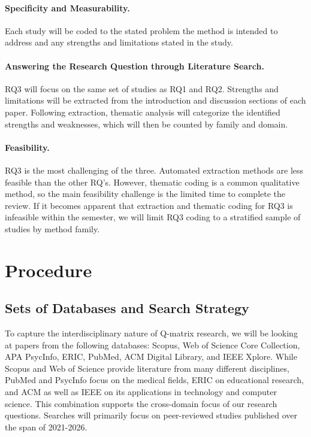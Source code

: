 \documentclass[sigconf,nonacm]{acmart}
\begin{document}
\paragraph{Specificity and Measurability.} Each study will be coded to the stated problem the method is intended to address and any strengths and limitations stated in the study.

\paragraph{Answering the Research Question through Literature Search.} RQ3 will focus on the same set of studies as RQ1 and RQ2. Strengths and limitations will be extracted from the introduction and discussion sections of each paper. Following extraction, thematic analysis will categorize the identified strengths and weaknesses, which will then be counted by family and domain.

\paragraph{Feasibility.} RQ3 is the most challenging of the three. Automated extraction methods are less feasible than the other RQ’s. However, thematic coding is a common qualitative method, so the main feasibility challenge is the limited time to complete the review. If it becomes apparent that extraction and thematic coding for RQ3 is infeasible within the semester, we will limit RQ3 coding to a stratified sample of studies by method family.

\section{Procedure}

\subsection{Sets of Databases and Search Strategy}

To capture the interdisciplinary nature of Q-matrix research, we will be looking at papers from the following databases: Scopus, Web of Science Core Collection, APA PsycInfo, ERIC, PubMed, ACM Digital Library, and IEEE Xplore. While Scopus and Web of Science provide literature from many different disciplines, PubMed and PsycInfo focus on the medical fields, ERIC on educational research, and ACM as well as IEEE on its applications in technology and computer science. This combination supports the cross-domain focus of our research questions. Searches will primarily focus on peer-reviewed studies published over the span of 2021-2026.
\end{document}
